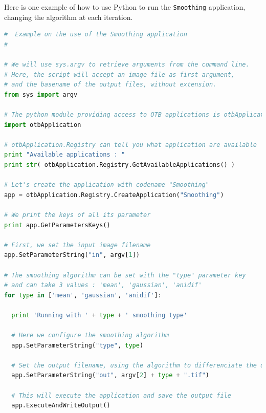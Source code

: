 Here is one example of how to use Python to run the \verb?Smoothing? application, changing the algorithm
at each iteration.

\begin{lstlisting}[language=python,breaklines=true,breakatwhitespace=true,frame = tb,framerule = 0.25pt,fontadjust,backgroundcolor={\color{listlightgray}},basicstyle = {\ttfamily\scriptsize},keywordstyle = {\ttfamily\color{listkeyword}\textbf},identifierstyle = {\ttfamily},commentstyle = {\ttfamily\color{listcomment}\textit},stringstyle = {\ttfamily},showstringspaces = false,showtabs = false,numbers = none,numbersep = 6pt, numberstyle={\ttfamily\color{listnumbers}},tabsize = 2]
#  Example on the use of the Smoothing application
#

# We will use sys.argv to retrieve arguments from the command line.
# Here, the script will accept an image file as first argument,
# and the basename of the output files, without extension.
from sys import argv

# The python module providing access to OTB applications is otbApplication
import otbApplication

# otbApplication.Registry can tell you what application are available
print "Available applications : "
print str( otbApplication.Registry.GetAvailableApplications() )

# Let's create the application with codename "Smoothing"
app = otbApplication.Registry.CreateApplication("Smoothing")

# We print the keys of all its parameter
print app.GetParametersKeys()

# First, we set the input image filename
app.SetParameterString("in", argv[1])

# The smoothing algorithm can be set with the "type" parameter key
# and can take 3 values : 'mean', 'gaussian', 'anidif'
for type in ['mean', 'gaussian', 'anidif']:

  print 'Running with ' + type + ' smoothing type'

  # Here we configure the smoothing algorithm
  app.SetParameterString("type", type)

  # Set the output filename, using the algorithm to differenciate the outputs
  app.SetParameterString("out", argv[2] + type + ".tif")

  # This will execute the application and save the output file
  app.ExecuteAndWriteOutput()

\end{lstlisting}



